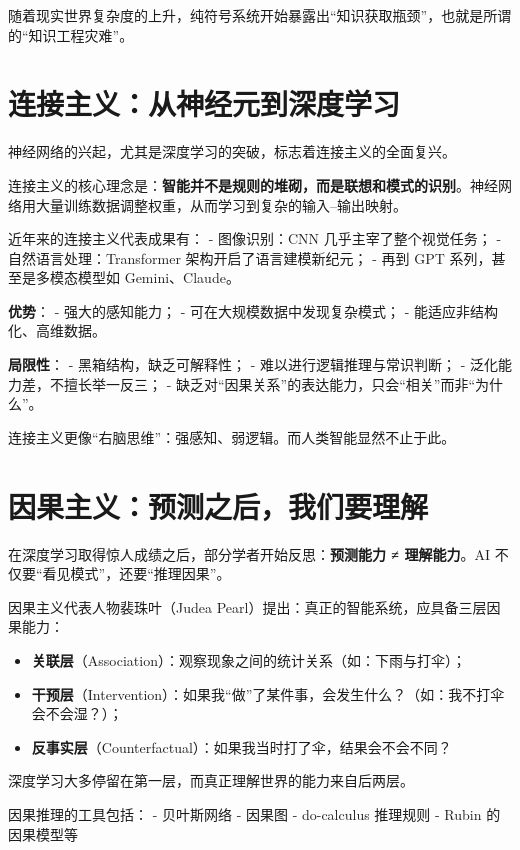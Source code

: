 随着现实世界复杂度的上升，纯符号系统开始暴露出“知识获取瓶颈”，也就是所谓的“知识工程灾难”。

\section*{连接主义：从神经元到深度学习}

神经网络的兴起，尤其是深度学习的突破，标志着连接主义的全面复兴。

连接主义的核心理念是：\textbf{智能并不是规则的堆砌，而是联想和模式的识别}。神经网络用大量训练数据调整权重，从而学习到复杂的输入–输出映射。

近年来的连接主义代表成果有：
- 图像识别：CNN 几乎主宰了整个视觉任务；
- 自然语言处理：Transformer 架构开启了语言建模新纪元；
- 再到 GPT 系列，甚至是多模态模型如 Gemini、Claude。

\textbf{优势}：
- 强大的感知能力；
- 可在大规模数据中发现复杂模式；
- 能适应非结构化、高维数据。

\textbf{局限性}：
- 黑箱结构，缺乏可解释性；
- 难以进行逻辑推理与常识判断；
- 泛化能力差，不擅长举一反三；
- 缺乏对“因果关系”的表达能力，只会“相关”而非“为什么”。

连接主义更像“右脑思维”：强感知、弱逻辑。而人类智能显然不止于此。

\section*{因果主义：预测之后，我们要理解}

在深度学习取得惊人成绩之后，部分学者开始反思：\textbf{预测能力 ≠ 理解能力}。AI 不仅要“看见模式”，还要“推理因果”。

因果主义代表人物裴珠叶（Judea Pearl）提出：真正的智能系统，应具备三层因果能力：

\begin{itemize}
\item \textbf{关联层}（Association）：观察现象之间的统计关系（如：下雨与打伞）；
\item \textbf{干预层}（Intervention）：如果我“做”了某件事，会发生什么？（如：我不打伞会不会湿？）；
\item \textbf{反事实层}（Counterfactual）：如果我当时打了伞，结果会不会不同？
\end{itemize}

深度学习大多停留在第一层，而真正理解世界的能力来自后两层。

因果推理的工具包括：
- 贝叶斯网络
- 因果图
- do-calculus 推理规则
- Rubin 的因果模型等

